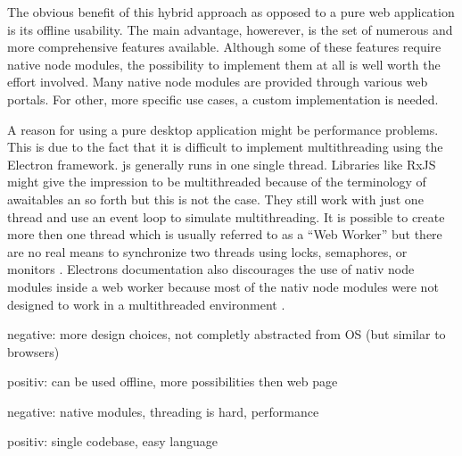 The obvious benefit of this hybrid approach as opposed to a pure web application is its offline usability.  The main advantage, howerever, is the set of numerous and more comprehensive features available. Although some of these features require native node modules, the possibility to implement them at all is well worth the effort involved. Many native node modules are provided through various web portals. For other, more specific use cases, a custom implementation is needed.


A reason for using a pure desktop application might be performance problems. This is due to the fact that it is difficult to implement multithreading using the Electron framework. \gls{js} generally runs in one single thread. Libraries like RxJS might give the impression to be multithreaded because of the terminology of awaitables an so forth but this is not the case. They still work with just one thread and use an event loop to simulate multithreading. It is possible to create more then one thread which is usually referred to as a \enquote{Web Worker} but there are no real means to synchronize two threads using locks, semaphores, or monitors \cite{jsWebWorkers}. Electrons documentation also discourages the use of nativ node modules inside a web worker because most of the nativ node modules were not designed to work in a multithreaded environment \cite{electronMultithreading}.




negative: more design choices, not completly abstracted from OS (but similar to browsers)

positiv: can be used offline, more possibilities then web page

negative: native modules, threading is hard, performance

positiv: single codebase, easy language
